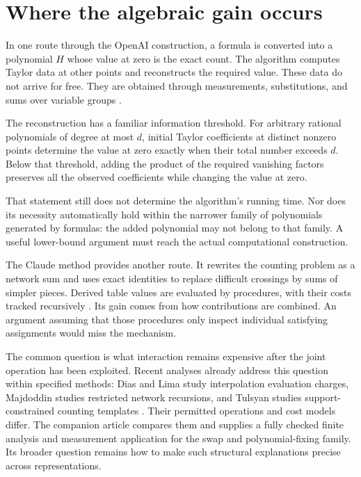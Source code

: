 \documentclass[11pt,letterpaper]{article}
\begin{document}
\section{Where the algebraic gain
occurs}\label{where-the-algebraic-gain-occurs}

In one route through the OpenAI construction, a formula is converted
into a polynomial \(H\) whose value at zero is the exact count. The
algorithm computes Taylor data at other points and reconstructs the
required value. These data do not arrive for free. They are obtained
through measurements, substitutions, and sums over variable groups
\citep{O26}.

The reconstruction has a familiar information threshold. For arbitrary
rational polynomials of degree at most \(d\), initial Taylor
coefficients at distinct nonzero points determine the value at zero
exactly when their total number exceeds \(d\). Below that threshold,
adding the product of the required vanishing factors preserves all the
observed coefficients while changing the value at zero.

That statement still does not determine the algorithm's running time.
Nor does its necessity automatically hold within the narrower family of
polynomials generated by formulas: the added polynomial may not belong
to that family. A useful lower-bound argument must reach the actual
computational construction.

The Claude method provides another route. It rewrites the counting
problem as a network sum and uses exact identities to replace difficult
crossings by sums of simpler pieces. Derived table values are evaluated
by procedures, with their costs tracked recursively \citep{Ant26}. Its
gain comes from how contributions are combined. An argument assuming
that those procedures only inspect individual satisfying assignments
would miss the mechanism.

The common question is what interaction remains expensive after the
joint operation has been exploited. Recent analyses already address this
question within specified methods: Dias and Lima study interpolation
evaluation charges, Majdoddin studies restricted network recursions, and
Tulsyan studies support-constrained counting templates
\citep{DL26, Maj26, T26}. Their permitted operations and cost models
differ. The companion article compares them and supplies a fully checked
finite analysis and measurement application for the swap and
polynomial-fixing family. Its broader question remains how to make such
structural explanations precise across representations.
\end{document}
